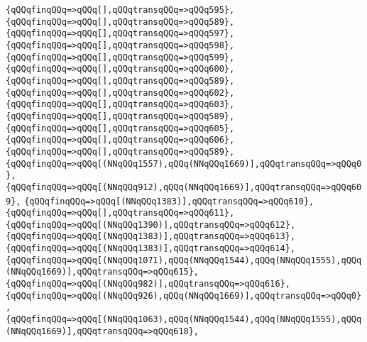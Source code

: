 \verb|{qQQqfinqQQq=>qQQq[],qQQqtransqQQq=>qQQq595},|\newline
\verb|{qQQqfinqQQq=>qQQq[],qQQqtransqQQq=>qQQq589},|\newline
\verb|{qQQqfinqQQq=>qQQq[],qQQqtransqQQq=>qQQq597},|\newline
\verb|{qQQqfinqQQq=>qQQq[],qQQqtransqQQq=>qQQq598},|\newline
\verb|{qQQqfinqQQq=>qQQq[],qQQqtransqQQq=>qQQq599},|\newline
\verb|{qQQqfinqQQq=>qQQq[],qQQqtransqQQq=>qQQq600},|\newline
\verb|{qQQqfinqQQq=>qQQq[],qQQqtransqQQq=>qQQq589},|\newline
\verb|{qQQqfinqQQq=>qQQq[],qQQqtransqQQq=>qQQq602},|\newline
\verb|{qQQqfinqQQq=>qQQq[],qQQqtransqQQq=>qQQq603},|\newline
\verb|{qQQqfinqQQq=>qQQq[],qQQqtransqQQq=>qQQq589},|\newline
\verb|{qQQqfinqQQq=>qQQq[],qQQqtransqQQq=>qQQq605},|\newline
\verb|{qQQqfinqQQq=>qQQq[],qQQqtransqQQq=>qQQq606},|\newline
\verb|{qQQqfinqQQq=>qQQq[],qQQqtransqQQq=>qQQq589},|\newline
\verb|{qQQqfinqQQq=>qQQq[(NNqQQq1557),qQQq(NNqQQq1669)],qQQqtransqQQq=>qQQq0},|\newline
\verb|{qQQqfinqQQq=>qQQq[(NNqQQq912),qQQq(NNqQQq1669)],qQQqtransqQQq=>qQQq609},|\newline
\verb|{qQQqfinqQQq=>qQQq[(NNqQQq1383)],qQQqtransqQQq=>qQQq610},|\newline
\verb|{qQQqfinqQQq=>qQQq[],qQQqtransqQQq=>qQQq611},|\newline
\verb|{qQQqfinqQQq=>qQQq[(NNqQQq1390)],qQQqtransqQQq=>qQQq612},|\newline
\verb|{qQQqfinqQQq=>qQQq[(NNqQQq1383)],qQQqtransqQQq=>qQQq613},|\newline
\verb|{qQQqfinqQQq=>qQQq[(NNqQQq1383)],qQQqtransqQQq=>qQQq614},|\newline
\verb|{qQQqfinqQQq=>qQQq[(NNqQQq1071),qQQq(NNqQQq1544),qQQq(NNqQQq1555),qQQq(NNqQQq1669)],qQQqtransqQQq=>qQQq615},|\newline
\verb|{qQQqfinqQQq=>qQQq[(NNqQQq982)],qQQqtransqQQq=>qQQq616},|\newline
\verb|{qQQqfinqQQq=>qQQq[(NNqQQq926),qQQq(NNqQQq1669)],qQQqtransqQQq=>qQQq0},|\newline
\verb|{qQQqfinqQQq=>qQQq[(NNqQQq1063),qQQq(NNqQQq1544),qQQq(NNqQQq1555),qQQq(NNqQQq1669)],qQQqtransqQQq=>qQQq618},|\newline
